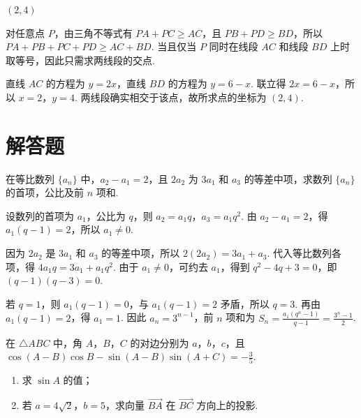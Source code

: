 \begin{answer}
\((2,4)\)
\end{answer}

\begin{solution}
对任意点 \(P\)，由三角不等式有 \(PA+PC\geqslant AC\)，且 \(PB+PD\geqslant BD\)，所以
\(PA+PB+PC+PD\geqslant AC+BD\). 当且仅当 \(P\) 同时在线段 \(AC\) 和线段 \(BD\) 上时取等号，因此只需求两线段的交点.

直线 \(AC\) 的方程为 \(y=2x\)，直线 \(BD\) 的方程为 \(y=6-x\). 联立得 \(2x=6-x\)，所以 \(x=2\)，\(y=4\). 两线段确实相交于该点，故所求点的坐标为 \((2,4)\).
\end{solution}

\section{解答题}

\begin{problem}
在等比数列 \(\{a_n\}\) 中，\(a_2-a_1=2\)，且 \(2a_2\) 为 \(3a_1\) 和 \(a_3\) 的等差中项，求数列 \(\{a_n\}\) 的首项，公比及前 \(n\) 项和.
\end{problem}

\begin{solution}
设数列的首项为 \(a_1\)，公比为 \(q\)，则 \(a_2=a_1q\)，\(a_3=a_1q^2\). 由 \(a_2-a_1=2\)，得
\(a_1(q-1)=2\)，所以 \(a_1\neq0\).

因为 \(2a_2\) 是 \(3a_1\) 和 \(a_3\) 的等差中项，所以
\(2(2a_2)=3a_1+a_3\). 代入等比数列各项，得 \(4a_1q=3a_1+a_1q^2\). 由于 \(a_1\neq0\)，可约去 \(a_1\)，得到
\(q^2-4q+3=0\)，即 \((q-1)(q-3)=0\).

若 \(q=1\)，则 \(a_1(q-1)=0\)，与 \(a_1(q-1)=2\) 矛盾，所以 \(q=3\). 再由 \(a_1(q-1)=2\)，得 \(a_1=1\). 因此 \(a_n=3^{n-1}\)，前 \(n\) 项和为
\(S_n=\frac{a_1(q^n-1)}{q-1}=\frac{3^n-1}{2}\).
\end{solution}

\begin{problem}
在 \(\triangle ABC\) 中，角 \(A\)，\(B\)，\(C\) 的对边分别为 \(a\)，\(b\)，\(c\)，且 \(\cos\left(A-B\right)\cos B-\sin\left(A-B\right)\sin\left(A+C\right)=-\frac35\).
\begin{enumerate}
\item 求 \(\sin A\) 的值；
\item 若 \(a=4\sqrt2\)，\(b=5\)，求向量 \(\overrightarrow{BA}\) 在 \(\overrightarrow{BC}\) 方向上的投影.
\end{enumerate}
\end{problem}

